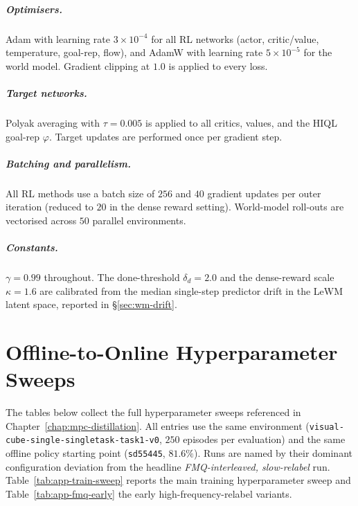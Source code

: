 \paragraph{Optimisers.} Adam with learning rate $3\!\times\!10^{-4}$
for all RL networks (actor, critic/value, temperature, goal-rep, flow),
and AdamW with learning rate $5\!\times\!10^{-5}$ for the world model.
Gradient clipping at $1.0$ is applied to every loss.

\paragraph{Target networks.} Polyak averaging with $\tau = 0.005$ is
applied to all critics, values, and the HIQL goal-rep $\varphi$. Target
updates are performed once per gradient step.

\paragraph{Batching and parallelism.} All RL methods use a batch size
of $256$ and $40$ gradient updates per outer iteration (reduced to $20$
in the dense reward setting). World-model roll-outs are vectorised
across $50$ parallel environments.

\paragraph{Constants.} $\gamma = 0.99$ throughout. The done-threshold
$\delta_d = 2.0$ and the dense-reward scale $\kappa = 1.6$ are
calibrated from the median single-step predictor drift in the LeWM
latent space, reported in \S\ref{sec:wm-drift}.

\chapter{Offline-to-Online Hyperparameter Sweeps}
\label{app:oo-sweeps}

The tables below collect the full hyperparameter sweeps referenced in
Chapter~\ref{chap:mpc-distillation}. All entries use the same environment
(\texttt{visual-cube-single-singletask-task1-v0}, $250$ episodes per
evaluation) and the same offline policy starting point (\texttt{sd55445},
$81.6\%$). Runs are named by their dominant configuration deviation
from the headline \emph{FMQ-interleaved, slow-relabel} run.
Table~\ref{tab:app-train-sweep} reports the main training hyperparameter
sweep and Table~\ref{tab:app-fmq-early} the early high-frequency-relabel
variants.

